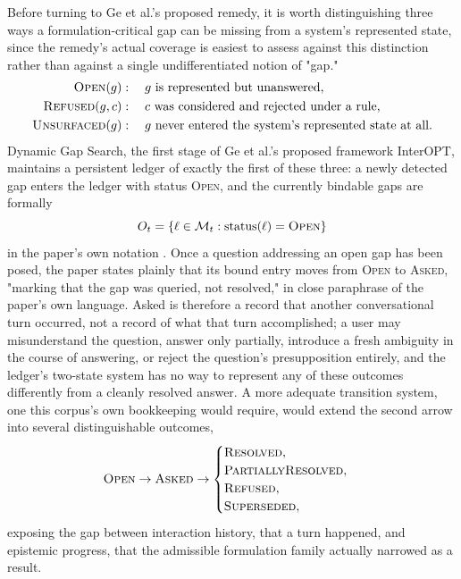 \documentclass[11pt]{article}
\begin{document}
Before turning to Ge et al.'s proposed remedy, it is worth distinguishing three ways a formulation-critical gap can be missing from a system's represented state, since the remedy's actual coverage is easiest to assess against this distinction rather than against a single undifferentiated notion of "gap."
$$
\begin{aligned}
\textsc{Open}(g) &: \quad g \text{ is represented but unanswered,} \\
\textsc{Refused}(g,c) &: \quad c \text{ was considered and rejected under a rule,} \\
\textsc{Unsurfaced}(g) &: \quad g \text{ never entered the system's represented state at all.}
\end{aligned}
$$
Dynamic Gap Search, the first stage of Ge et al.'s proposed framework InterOPT, maintains a persistent ledger of exactly the first of these three: a newly detected gap enters the ledger with status \textsc{Open}, and the currently bindable gaps are formally
$$O_t = \{\ell \in \mathcal{M}_t : \text{status}(\ell) = \textsc{Open}\}$$
in the paper's own notation \cite{ge2026ask}. Once a question addressing an open gap has been posed, the paper states plainly that its bound entry moves from \textsc{Open} to \textsc{Asked}, "marking that the gap was queried, not resolved," in close paraphrase of the paper's own language. Asked is therefore a record that another conversational turn occurred, not a record of what that turn accomplished; a user may misunderstand the question, answer only partially, introduce a fresh ambiguity in the course of answering, or reject the question's presupposition entirely, and the ledger's two-state system has no way to represent any of these outcomes differently from a cleanly resolved answer. A more adequate transition system, one this corpus's own bookkeeping would require, would extend the second arrow into several distinguishable outcomes,
$$\textsc{Open} \to \textsc{Asked} \to \begin{cases} \textsc{Resolved}, \\ \textsc{PartiallyResolved}, \\ \textsc{Refused}, \\ \textsc{Superseded}, \end{cases}$$
exposing the gap between interaction history, that a turn happened, and epistemic progress, that the admissible formulation family actually narrowed as a result.
\end{document}
